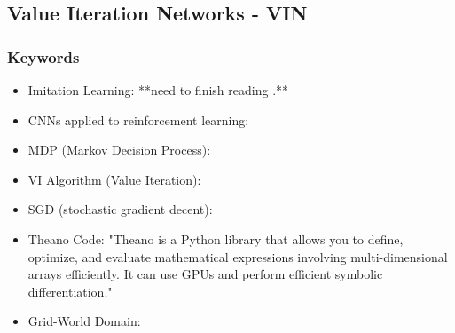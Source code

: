 \documentclass[11pt]{article}
\begin{document}
\subsection{Value Iteration Networks - VIN \cite{VIN}}
\subsubsection{Keywords}
\begin{itemize}
	\item Imitation Learning: **need to finish reading \cite{Vitaly_Kurin_2017}.**
	
	\item CNNs applied to reinforcement learning: 
	
	\item MDP (Markov Decision Process):
	
	\item VI Algorithm (Value Iteration): 
	
	\item SGD (stochastic gradient decent):
	
	\item Theano Code: "Theano is a Python library that allows you to define, optimize, and evaluate mathematical expressions involving multi-dimensional arrays efficiently. It can use GPUs and perform efficient symbolic differentiation." 
	
	\item Grid-World Domain:

\end{itemize}

\newpage 
 

\end{document}
